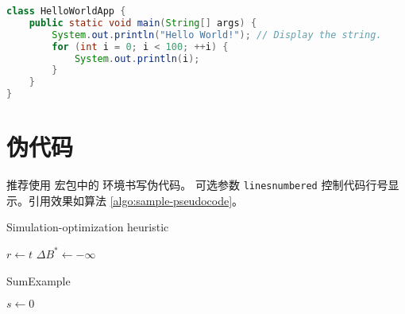 \noindent%
\begin{minipage}{\linewidth}
\begin{lstlisting}[language=java,caption={Java 代码示例（使用 \pkg{listings} 高亮）},xleftmargin=20pt,label={lst:sample-code-listings}]
class HelloWorldApp {
    public static void main(String[] args) {
        System.out.println("Hello World!"); // Display the string.
        for (int i = 0; i < 100; ++i) {
            System.out.println(i);
        }
    }
}
\end{lstlisting}
\end{minipage}
 
\section{伪代码}
 

推荐使用  宏包中的  环境书写伪代码。 可选参数 \verb|linesnumbered| 控制代码行号显示。引用效果如算法 \ref{algo:sample-pseudocode}。

\begin{algorithm}
  \caption{Simulation-optimization heuristic}
  \label{algo:sample-pseudocode}
  $r\leftarrow t$\;
  $\Delta B^{\ast}\leftarrow -\infty$\;
\end{algorithm}


\begin{algorithm}
  \caption{SumExample}
  \label{algo:sample-pseudocode2}
  $s\leftarrow 0$ 
  \SetNoFillComment %
  \SetFillComment
   \;
\end{algorithm}

